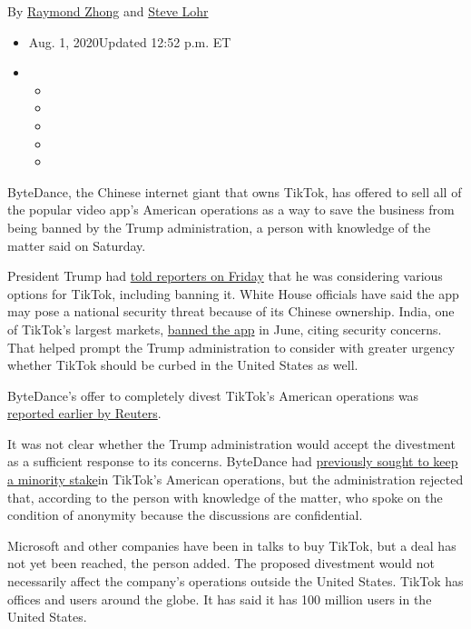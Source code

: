 By \href{https://www.nytimes3xbfgragh.onion/by/raymond-zhong}{Raymond
Zhong} and \href{https://www.nytimes3xbfgragh.onion/by/steve-lohr}{Steve
Lohr}

\begin{itemize}
\item
  Aug. 1, 2020Updated 12:52 p.m. ET
\item
  \begin{itemize}
  \item
  \item
  \item
  \item
  \item
  \end{itemize}
\end{itemize}

ByteDance, the Chinese internet giant that owns TikTok, has offered to
sell all of the popular video app's American operations as a way to save
the business from being banned by the Trump administration, a person
with knowledge of the matter said on Saturday.

President Trump had
\href{https://www.nytimes3xbfgragh.onion/2020/07/31/technology/tiktok-microsoft.html}{told
reporters on Friday} that he was considering various options for TikTok,
including banning it. White House officials have said the app may pose a
national security threat because of its Chinese ownership. India, one of
TikTok's largest markets,
\href{https://www.nytimes3xbfgragh.onion/2020/06/30/technology/india-china-tiktok.html}{banned
the app} in June, citing security concerns. That helped prompt the Trump
administration to consider with greater urgency whether TikTok should be
curbed in the United States as well.

ByteDance's offer to completely divest TikTok's American operations was
\href{https://www.reuters.com/article/us-usa-tiktok-bytedance-exclusive-idUSKBN24X3SK}{reported
earlier by Reuters}.

It was not clear whether the Trump administration would accept the
divestment as a sufficient response to its concerns. ByteDance had
\href{https://www.nytimes3xbfgragh.onion/2020/07/23/business/dealbook/tiktok-bytedance-investors-trump.html?searchResultPosition=2}{previously
sought to keep a minority stake}in TikTok's American operations, but the
administration rejected that, according to the person with knowledge of
the matter, who spoke on the condition of anonymity because the
discussions are confidential.

Microsoft and other companies have been in talks to buy TikTok, but a
deal has not yet been reached, the person added. The proposed divestment
would not necessarily affect the company's operations outside the United
States. TikTok has offices and users around the globe. It has said it
has 100 million users in the United States.

